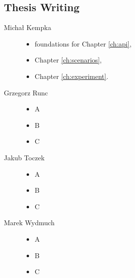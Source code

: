 	\subsection{Thesis Writing}
	\begin{description}
		\item[Michał Kempka] \hfill
			\begin{itemize}
				\item foundations for Chapter \ref{ch:api},
				\item Chapter \ref{ch:scenarios},
				\item Chapter \ref{ch:experiment}.
			\end{itemize}
		\item[Grzegorz Runc] \hfill
			\begin{itemize}
				\item A
				\item B
				\item C
			\end{itemize}
		\item[Jakub Toczek] \hfill
			\begin{itemize}
				\item A
				\item B
				\item C
			\end{itemize}
		\item[Marek Wydmuch] \hfill
			\begin{itemize}
				\item A
				\item B
				\item C
			\end{itemize}
	\end{description}
